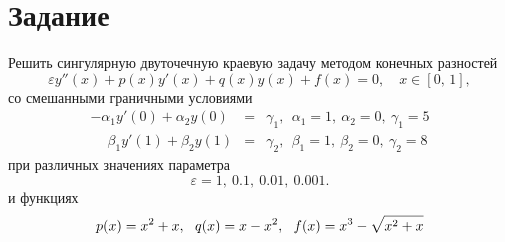 \documentclass[a4paper,12pt]{extarticle}
\begin{document}
    \setcounter{page}{2}
    \tableofcontents
    \vspace{\baselineskip}
   
    
    \newpage
    \section{Задание}
     Решить сингулярную двуточечную краевую задачу методом конечных разностей
    $$
    \varepsilon y''(x) + p(x)y'(x) + q(x)y(x) + f(x) = 0,\quad x\in[0,\,1],
    $$
    со смешанными граничными условиями
    $$
    \begin{array}{rcl}
    -\alpha_1y'(0) + \alpha_2y(0)			&=&	\gamma_1, ~~\alpha_1 = 1, ~\alpha_2 = 0, ~\gamma_1 = 5\\[8pt]
    \phantom{-}\beta_1y'(1) + \beta_2y(1)	&=&	\gamma_2, ~~\beta_1 = 1, ~\beta_2 = 0, ~\gamma_2 = 8
    \end{array}
    $$
    при различных значениях параметра 
    $$
    \varepsilon=1,~0.1,~0.01,~0.001.
    $$
    и функциях
    $$
    p(x)=x^{2}+x,~~~\\[8pt]
    q(x)=x-x^{2},~~~\\[8pt]
    f(x)=x^{3}-\sqrt{x^{2}+x}
    $$
    
\end{document}
